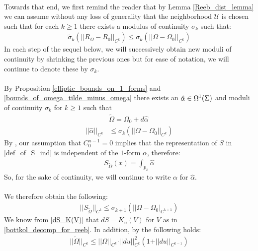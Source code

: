 \documentclass[11pt]{amsart}
\theoremstyle{plain}
\theoremstyle{definition}
\theoremstyle{remark}
\begin{document}
\\
Towards that end, we first remind the reader that by Lemma \ref{Reeb_dist_lemma} we can assume without any loss of generality that the neighborhood $\mathcal{U}$ is chosen such that for each $k \geq 1$ there exists a modulus of continuity $\sigma_k$ such that:
\begin{align}\label{normal_form_bounds_2}
    \tilde{\sigma}_{k}(\vert\vert R_{\Omega} - R_{0}\vert\vert_{C^{k}}) \leq \sigma_{k}(\vert\vert\Omega - \Omega_0\vert\vert_{C^{k}})
\end{align}
In each step of the sequel below, we will successively obtain new moduli of continuity by shrinking the previous ones but for ease of notation, we will continue to denote these by $\sigma_k$.\\
\\
By Proposition \ref{elliptic_bounds_on_1_forms} and \eqref{bounds_of_omega_tilde_minus_omega} there exists an $\Hat{\alpha} \in \Omega^1(\Sigma)$ and moduli of continuity $\sigma_k$ for $k \geq 1$ such that 
\begin{align}\label{nft_proof_alpha_hat_bound}
    &\tilde{\Omega} = \Omega_0 + d\hat{\alpha} \\\nonumber 
    \vert\vert \hat{\alpha}\vert\vert_{C^k}& \leq \sigma_{k}(\vert\vert\Omega - \Omega_0\vert\vert_{C^{k}})
\end{align}
By \cite[Lemma 4.5]{B-K-Odd_Symp}, our assumption that $C_0^{n-1}=0$ implies that the representation of $S$ in \eqref{def_of_S_ind} is independent of the $1$-form $\alpha$, therefore:
\begin{align*}
    S_{\tilde{\Omega}}(x) = \int_{p_x} \hat{\alpha}
\end{align*}
So, for the sake of continuity, we will continue to write $\alpha$ for $\hat{\alpha}$.\\
\\
We therefore obtain the following:
\begin{align}\label{bound_on_S}
    \vert\vert S_{\tilde{\Omega}}\vert\vert_{C^{k}} \leq \sigma_{k+1}(\vert\vert\Omega - \Omega_0\vert_{C^{k+1}})
\end{align}
We know from \eqref{dS=K(V)} that $dS = K_u(V)$ for $V$ as in \eqref{bottkol_decomp_for_reeb}. In addition, by \cite[Lemma 1.1]{Abbondandolo-Benedetti} the following holds:
\begin{align}\label{nft_bound_3}
    \vert\vert \tilde{\Omega}\vert\vert_{C^k} \leq \vert\vert\Omega\vert\vert_{C^k} \cdot \vert\vert du\vert\vert^2_{C^k}(1+\vert\vert du\vert\vert_{C^{k-1}})
\end{align}
\end{document}
